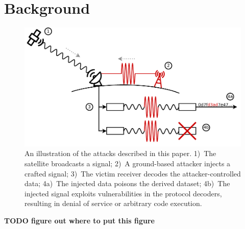 \section{Background}\label{sec:background}

\begin{figure}
    \centering
    \includegraphics[width=\columnwidth]{diagrams/attack_illustration.pdf}
    \caption{An illustration of the attacks described in this paper. 1)~The satellite broadcasts a signal; 2)~A ground-based attacker injects a crafted signal; 3)~The victim receiver decodes the attacker-controlled data; 4a)~The injected data poisons the derived dataset; 4b)~The injected signal exploits vulnerabilities in the protocol decoders, resulting in denial of service or arbitrary code execution.}
    \label{fig:attack-illustration}
\end{figure}

\textbf{TODO figure out where to put this figure}

